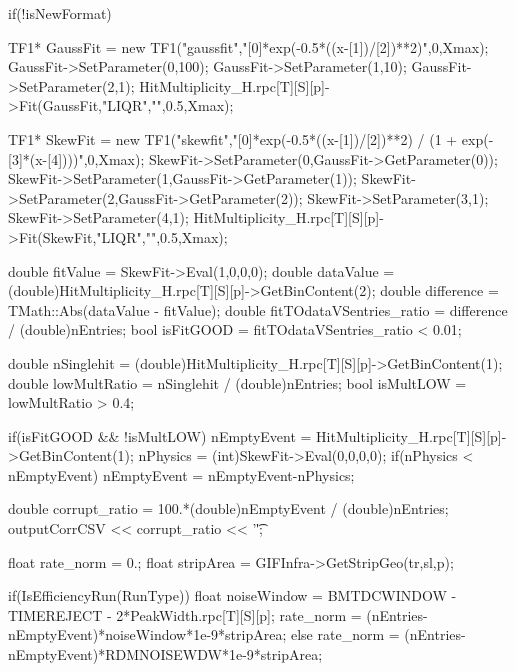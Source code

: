 	\begin{code}
	\begin{cppcode}
if(!isNewFormat){
	TF1* GaussFit = new TF1("gaussfit","[0]*exp(-0.5*((x-[1])/[2])**2)",0,Xmax);
	GaussFit->SetParameter(0,100);
	GaussFit->SetParameter(1,10);
	GaussFit->SetParameter(2,1);
	HitMultiplicity_H.rpc[T][S][p]->Fit(GaussFit,"LIQR","",0.5,Xmax);

	TF1* SkewFit = new TF1("skewfit","[0]*exp(-0.5*((x-[1])/[2])**2) / (1 + exp(-[3]*(x-[4])))",0,Xmax);
	SkewFit->SetParameter(0,GaussFit->GetParameter(0));
	SkewFit->SetParameter(1,GaussFit->GetParameter(1));
	SkewFit->SetParameter(2,GaussFit->GetParameter(2));
	SkewFit->SetParameter(3,1);
	SkewFit->SetParameter(4,1);
	HitMultiplicity_H.rpc[T][S][p]->Fit(SkewFit,"LIQR","",0.5,Xmax);

	double fitValue = SkewFit->Eval(1,0,0,0);
	double dataValue = (double)HitMultiplicity_H.rpc[T][S][p]->GetBinContent(2);
	double difference = TMath::Abs(dataValue - fitValue);
	double fitTOdataVSentries_ratio = difference / (double)nEntries;
	bool isFitGOOD = fitTOdataVSentries_ratio < 0.01;

	double nSinglehit = (double)HitMultiplicity_H.rpc[T][S][p]->GetBinContent(1);
	double lowMultRatio = nSinglehit / (double)nEntries;
	bool isMultLOW = lowMultRatio > 0.4;

	if(isFitGOOD && !isMultLOW){
		nEmptyEvent = HitMultiplicity_H.rpc[T][S][p]->GetBinContent(1);
		nPhysics = (int)SkewFit->Eval(0,0,0,0);
		if(nPhysics < nEmptyEvent)
		nEmptyEvent = nEmptyEvent-nPhysics;
	}
}

double corrupt_ratio = 100.*(double)nEmptyEvent / (double)nEntries;
outputCorrCSV << corrupt_ratio << '\t';

float rate_norm = 0.;
float stripArea = GIFInfra->GetStripGeo(tr,sl,p);	
	
if(IsEfficiencyRun(RunType)){
	float noiseWindow = BMTDCWINDOW - TIMEREJECT - 2*PeakWidth.rpc[T][S][p];
	rate_norm = (nEntries-nEmptyEvent)*noiseWindow*1e-9*stripArea;
} else
	rate_norm = (nEntries-nEmptyEvent)*RDMNOISEWDW*1e-9*stripArea;
	\end{cppcode}
	\label{cpp:rate_norm}
	\vspace{5mm}
	\end{code}
	
